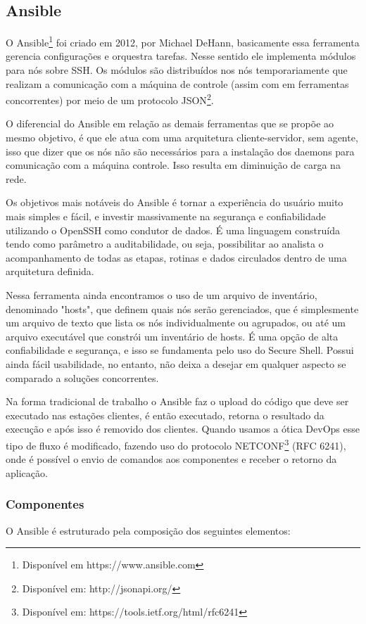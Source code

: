 \subsection{Ansible}

O Ansible\footnote{Disponível em https://www.ansible.com} foi criado em 2012, por Michael DeHann, basicamente essa ferramenta gerencia configurações e orquestra tarefas. Nesse sentido ele implementa módulos para nós sobre SSH. Os módulos são distribuídos nos nós temporariamente que realizam a comunicação com a máquina de controle (assim com em ferramentas concorrentes) por meio de um protocolo JSON\footnote{Disponível em: http://jsonapi.org/}.

O diferencial do Ansible em relação as demais ferramentas que se propõe ao mesmo objetivo, é que ele atua com uma arquitetura cliente-servidor, sem agente,  isso que dizer que os nós não são necessários para a instalação dos daemons para comunicação com a máquina controle. Isso resulta em diminuição de carga na rede. 

Os objetivos mais notáveis do Ansible é tornar a experiência do usuário muito mais simples e fácil, e investir massivamente na segurança e confiabilidade utilizando o OpenSSH como condutor de dados. É uma linguagem construída tendo como parâmetro a auditabilidade, ou seja, possibilitar ao analista o acompanhamento de todas as etapas, rotinas e dados circulados dentro de uma arquitetura definida.\cite{marcelocosta}

Nessa ferramenta ainda encontramos o uso de um arquivo de inventário, denominado "hosts", que definem quais nós serão gerenciados, que é simplesmente um arquivo de texto que lista os nós individualmente ou agrupados, ou até um arquivo executável que constrói um inventário de hosts. É uma opção de alta confiabilidade e segurança, e isso se fundamenta pelo uso do Secure Shell. Possui ainda fácil usabilidade, no entanto, não deixa a desejar em qualquer aspecto se comparado a soluções concorrentes.

Na forma tradicional de trabalho o Ansible faz o upload do código que deve ser executado nas estações clientes, é então executado, retorna o resultado da execução e após isso é removido dos clientes. Quando usamos a ótica DevOps esse tipo de fluxo é modificado, fazendo uso do protocolo NETCONF\footnote{Disponível em: https://tools.ietf.org/html/rfc6241} (RFC 6241), onde é possível o envio de comandos aos componentes e receber o retorno da aplicação.

\subsubsection{Componentes}
O Ansible é estruturado pela composição dos seguintes elementos:

